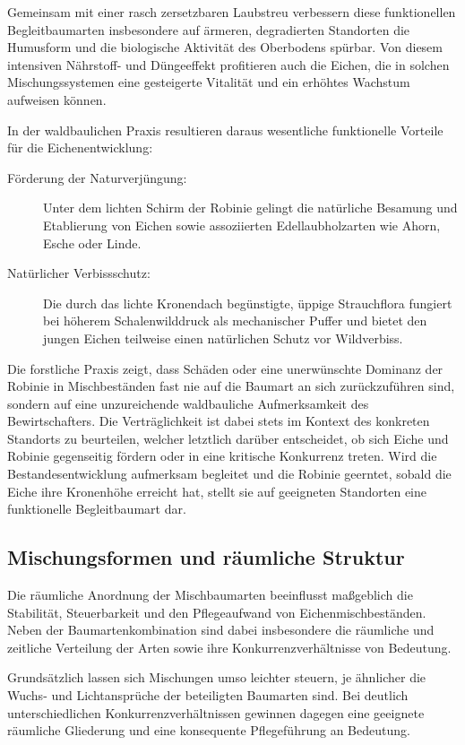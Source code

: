 \documentclass[twocolumn, bibliography=totoc, abstract=true]{scrartcl}
\begin{document}
Gemeinsam mit einer rasch zersetzbaren Laubstreu verbessern diese funktionellen Begleitbaumarten insbesondere auf ärmeren, degradierten Standorten die Humusform und die biologische Aktivität des Oberbodens spürbar. Von diesem intensiven Nährstoff- und Düngeeffekt profitieren auch die Eichen, die in solchen Mischungssystemen eine gesteigerte Vitalität und ein erhöhtes Wachstum aufweisen können.

In der waldbaulichen Praxis resultieren daraus wesentliche funktionelle Vorteile für die Eichenentwicklung:
\begin{description}
\item[Förderung der Naturverjüngung:] Unter dem lichten Schirm der Robinie gelingt die natürliche Besamung und Etablierung von Eichen sowie assoziierten Edellaubholzarten wie Ahorn, Esche oder Linde.
\item[Natürlicher Verbissschutz:] Die durch das lichte Kronendach begünstigte, üppige Strauchflora fungiert bei höherem Schalenwilddruck als mechanischer Puffer und bietet den jungen Eichen teilweise einen natürlichen Schutz vor Wildverbiss.
\end{description}

Die forstliche Praxis zeigt, dass Schäden oder eine unerwünschte Dominanz der Robinie in Mischbeständen fast nie auf die Baumart an sich zurückzuführen sind, sondern auf eine unzureichende waldbauliche Aufmerksamkeit des Bewirtschafters. Die Verträglichkeit ist dabei stets im Kontext des konkreten Standorts zu beurteilen, welcher letztlich darüber entscheidet, ob sich Eiche und Robinie gegenseitig fördern oder in eine kritische Konkurrenz treten. Wird die Bestandesentwicklung aufmerksam begleitet und die Robinie geerntet, sobald die Eiche ihre Kronenhöhe erreicht hat, stellt sie auf geeigneten Standorten eine funktionelle Begleitbaumart dar.

\subsection{Mischungsformen und räumliche Struktur}

Die räumliche Anordnung der Mischbaumarten beeinflusst maßgeblich die Stabilität, Steuerbarkeit und den Pflegeaufwand von Eichenmischbeständen. Neben der Baumartenkombination sind dabei insbesondere die räumliche und zeitliche Verteilung der Arten sowie ihre Konkurrenzverhältnisse von Bedeutung.

Grundsätzlich lassen sich Mischungen umso leichter steuern, je ähnlicher die Wuchs- und Lichtansprüche der beteiligten Baumarten sind. Bei deutlich unterschiedlichen Konkurrenzverhältnissen gewinnen dagegen eine geeignete räumliche Gliederung und eine konsequente Pflegeführung an Bedeutung.
\end{document}
